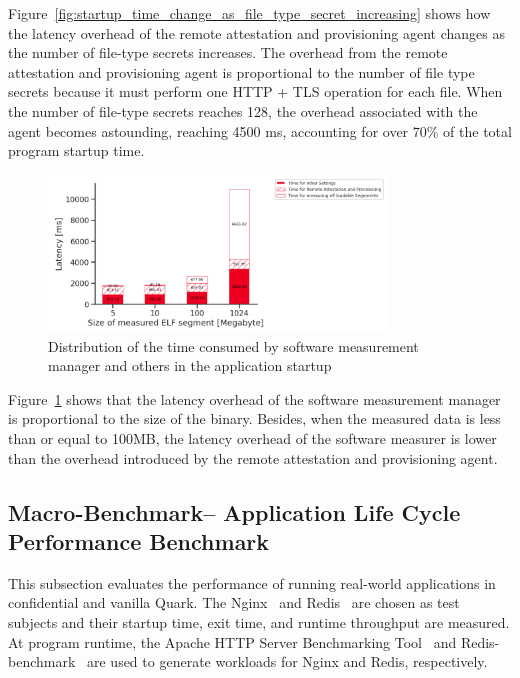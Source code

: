 Figure~\ref{fig:startup_time_change_as_file_type_secret_increasing} shows how the latency overhead of the remote attestation and provisioning agent changes as the number of file-type secrets increases. The overhead from the remote attestation and provisioning agent is proportional to the 
number of file type secrets because it must perform one HTTP + TLS operation for each file. When the number of file-type secrets reaches 128, the overhead associated with the agent becomes astounding, reaching 4500 ms, accounting for over 70\% of the total program startup time.
\begin{figure}[!htb]
    \centering
    \includegraphics[width=0.8\textwidth]{images/startup_time_change_as_elf_size_increasing.PNG}
    \caption[Distribution of the time consumed by software measurement manager and others in the Application Startup]{Distribution of the time consumed by software measurement manager and others in the application startup}
    \label{fig:startup_time_change_as_elf_size_increasing}
\end{figure}


Figure~\ref{fig:startup_time_change_as_elf_size_increasing} shows that the latency overhead of the software measurement manager is proportional to the size of the binary. Besides, when the measured data is less than or equal to 100MB, the latency overhead of the software measurer is lower than the 
overhead introduced by the remote attestation and provisioning agent.


\subsection{Macro-Benchmark– Application Life Cycle Performance Benchmark}\label{macri_app_start_up}

This subsection evaluates the performance of running real-world applications in confidential and vanilla Quark. The Nginx~\cite*{nginx} and Redis~\cite*{redis} are chosen as test subjects and their startup time, exit time, and runtime throughput are measured. At program runtime, the Apache HTTP 
Server Benchmarking Tool~\cite*{ab} and Redis-benchmark~\cite*{Redis_benchmark} are used to generate workloads for Nginx and Redis, respectively.

